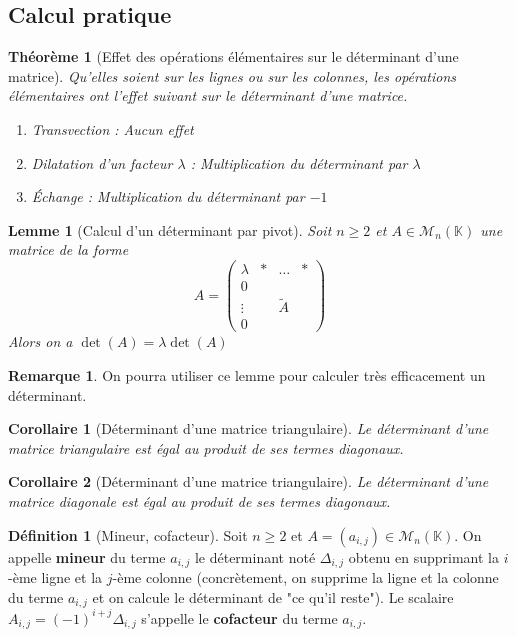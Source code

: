 \documentclass[french]{book}
\newcommand{\K}{\mathbb{K}}
\theoremstyle{plain}
\newtheorem{thm}{Théorème}[chapter]
\newtheorem{lem}{Lemme}[chapter]
\newtheorem{cor}{Corollaire}[chapter]
\theoremstyle{definition}
\newtheorem{dfn}{Définition}[chapter]
\newtheorem{rmq}{Remarque}[chapter]
\theoremstyle{remark}
\begin{document}
\subsection{Calcul pratique}
\begin{thm}[Effet des opérations élémentaires sur le déterminant d'une matrice]
	Qu'elles soient sur les lignes ou sur les colonnes, les opérations élémentaires ont l'effet suivant sur le déterminant d'une matrice.
	\begin{enumerate}
		\item Transvection : Aucun effet
		\item Dilatation d'un facteur $\lambda$ : Multiplication du déterminant par $\lambda$
		\item Échange : Multiplication du déterminant par $-1$
	\end{enumerate}
\end{thm}
\begin{lem}[Calcul d'un déterminant par pivot]
	Soit $n\geqslant2$ et $A\in\mathcal{M}_n(\K)$ une matrice de la forme $$A=\left(\begin{array}{c|ccc}
		\lambda&*&\ldots&*\\
		\hline
		0&&& \\
		\vdots&&\tilde{A}& \\
		0&&&
	\end{array}\right)$$
	Alors on a $\det(A)=\lambda\det(A)$
\end{lem}
\begin{rmq} On pourra utiliser ce lemme pour calculer très efficacement un déterminant. \end{rmq}
\begin{cor}[Déterminant d'une matrice triangulaire]
	Le déterminant d'une matrice triangulaire est égal au produit de ses termes diagonaux.
\end{cor}
\begin{cor}[Déterminant d'une matrice triangulaire]
	Le déterminant d'une matrice diagonale est égal au produit de ses termes diagonaux.
\end{cor}
\begin{dfn}[Mineur, cofacteur]
	Soit $n\geqslant2$ et $A=(a_{i,j})\in\mathcal{M}_n(\K)$. On appelle \textbf{mineur} du terme $a_{i,j}$ le déterminant noté $\Delta_{i,j}$ obtenu en supprimant la $i$-ème ligne et la $j$-ème colonne (concrètement, on supprime la ligne et la colonne du terme $a_{i,j}$ et on calcule le déterminant de "ce qu'il reste"). Le scalaire $A_{i,j}=(-1)^{i+j}\Delta_{i,j}$ s'appelle le \textbf{cofacteur} du terme $a_{i,j}$. 
\end{dfn}
\end{document}

